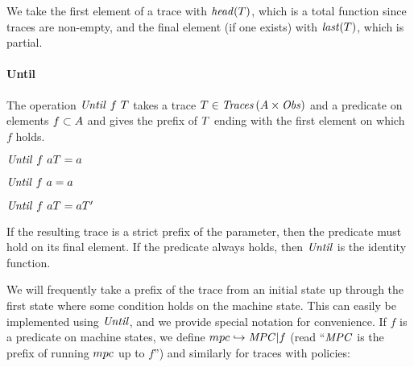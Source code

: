 \documentclass[acmsmall,review,anonymous]{acmart}\settopmatter{printfolios=true,printccs=false,printacmref=false}
\begin{document}
We take the first element of a trace with \(\mathit{head}(T)\), which is a total
function since traces are non-empty, and the final element (if one exists) with
\(\mathit{last}(T)\), which is partial.

\paragraph*{Until}
The operation \(\mathit{Until} ~ f ~ T\) takes a trace
\(T \in \mathit{Traces}\,(A \times \mathit{Obs})\) and a predicate
on elements \(f \subset A\) and gives the prefix of
\(T\) ending with the first element on which \(f\) holds.

\begin{center}
  \begin{minipage}{.3\textwidth}
             {\(\mathit{Until} ~ f ~ aT = a\)}
  \end{minipage}
%
  \begin{minipage}{.3\textwidth}
    \judgment{}
             {\(\mathit{Until} ~ f ~ a = a\)}
%
  \end{minipage}
  \begin{minipage}{.3\textwidth}
                {\(\mathit{Until} ~ f ~ aT = aT'\)}
  \end{minipage}
\end{center}
%
If the resulting trace is a strict prefix of the parameter, then the
predicate must hold on its final element. If the predicate always holds, then
\(\mathit{Until}\) is the identity function.



We will frequently take a prefix of the trace from an initial state up
through the first state where some condition holds on the machine state.
This can easily be implemented using \(\mathit{Until}\), and we provide special notation
for convenience.
%
If \(f\) is a predicate on machine states, we define \(mpc
\hookrightarrow \mathit{MPC} | f\) (read ``\(\mathit{MPC}\) is the prefix of
running \(mpc\) up to \(f\)'') and similarly for traces with policies:
\end{document}
